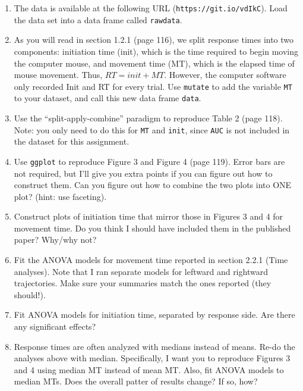 \documentclass[10pt]{article}
\begin{document}
\begin{enumerate}
\item The data is available at the following URL (\verb|https://git.io/vdIkC|).  Load the data set into a data frame called \verb|rawdata|.

\item As you will read in section 1.2.1 (page 116), we split response times into two components: initiation time (init), which is the time required to begin moving the computer mouse, and movement time (MT), which is the elapsed time of mouse movement.  Thus, $RT=init+MT$.  However, the computer software only recorded Init and RT for every trial.  Use \verb|mutate| to add the variable \verb|MT| to your dataset, and call this new data frame \verb|data|.

\item Use the ``split-apply-combine'' paradigm to reproduce Table 2 (page 118).  Note: you only need to do this for \verb|MT| and \verb|init|, since \verb|AUC| is not included in the dataset for this assignment.

\item Use \verb|ggplot| to reproduce Figure 3 and Figure 4 (page 119).  Error bars are not required, but I'll give you extra points if you can figure out how to construct them.  Can you figure out how to combine the two plots into ONE plot?  (hint: use faceting).

\item Construct plots of initiation time that mirror those in Figures 3 and 4 for movement time.  Do you think I should have included them in the published paper?  Why/why not?

\item Fit the ANOVA models for movement time reported in section 2.2.1 (Time analyses).  Note that I ran separate models for leftward and rightward trajectories.  Make sure your summaries match the ones reported (they should!).

\item Fit ANOVA models for initiation time, separated by response side.  Are there any significant effects?

\item Response times are often analyzed with medians instead of means.  Re-do the analyses above with median.  Specifically, I want you to reproduce Figures 3 and 4 using median MT instead of mean MT.  Also, fit ANOVA models to median MTs.  Does the overall patter of results change?  If so, how?
  
  
\end{enumerate}  
\end{document}
